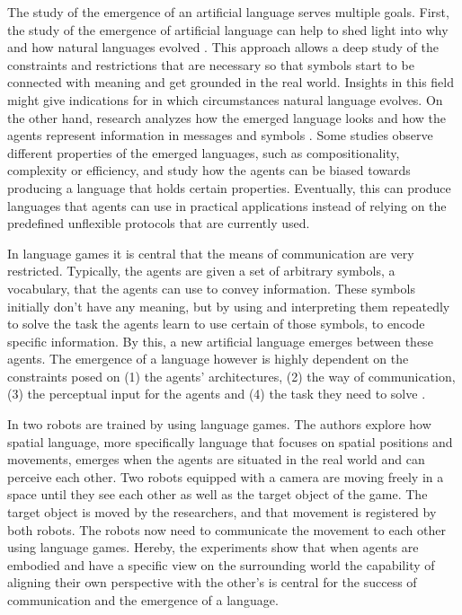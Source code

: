 The study of the emergence of an artificial language serves multiple goals.
First, the study of the emergence of artificial language can help to shed light into why and how natural languages evolved \citep{Bartlett2005,Kirby2002,Kirby2008,Noukhovitch2021}.
This approach allows a deep study of the constraints and restrictions that are necessary so that symbols start to be connected with meaning and get grounded in the real world.
Insights in this field might give indications for in which circumstances natural language evolves.
On the other hand, research analyzes how the emerged language looks and how the agents represent information in messages and symbols \citep{Baroni2022,Lazaridou2017,Chaabouni2022,Kottur2017}.
Some studies observe different properties of the emerged languages, such as compositionality, complexity or efficiency, and study how the agents can be biased towards producing a language that holds certain properties.
Eventually, this can produce languages that agents can use in practical applications instead of relying on the predefined unflexible protocols that are currently used.

In language games it is central that the means of communication are very restricted.
Typically, the agents are given a set of arbitrary symbols, a vocabulary, that the agents can use to convey information.
These symbols initially don't have any meaning, but by using and interpreting them repeatedly to solve the task the agents learn to use certain of those symbols, to encode specific information.
By this, a new artificial language emerges between these agents.
The emergence of a language however is highly dependent on the constraints posed on (1) the agents' architectures, (2) the way of communication, (3) the perceptual input for the agents and (4) the task they need to solve \citep{Baroni2022}.

In \citep{Steels2009} two robots are trained by using language games.
The authors explore how spatial language, more specifically language that focuses on spatial positions and movements, emerges when the agents are situated in the real world and can perceive each other.
Two robots equipped with a camera are moving freely in a space until they see each other as well as the target object of the game.
The target object is moved by the researchers, and that movement is registered by both robots.
The robots now need to communicate the movement to each other using language games.
Hereby, the experiments show that when agents are embodied and have a specific view on the surrounding world the capability of aligning their own perspective with the other's is central for the success of communication and the emergence of a language.

